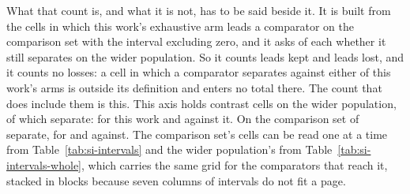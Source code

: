 \documentclass[journal=jcisd8,manuscript=suppinfo,layout=onecolumn]{achemso}
\begin{document}
What that count is, and what it is not, has to be said beside it. It is built from the cells in
which this work's exhaustive arm leads a comparator on the comparison set with the interval
excluding zero, and it asks of each whether it still separates on the wider population. So it
counts leads kept and leads lost, and it counts no losses: a cell in which a comparator separates
against either of this work's arms is outside its definition and enters no total there. The count
that does include them is this. This axis holds \numPopdefCellswhole{} contrast cells on the wider
population, of which \numPopdefSeparatingwhole{} separate: \numPopdefForthisworkwholeWord{} for
this work and \numPopdefAgainstthisworkwholeWord{} against it. On the comparison set
\numPopdefSeparatingcomp{} of \numPopdefCellscomp{} separate, \numPopdefForthisworkcompWord{} for
and \numPopdefAgainstthisworkcompWord{} against. The comparison set's cells can be read one at a
time from Table~\ref{tab:si-intervals} and the wider population's from
Table~\ref{tab:si-intervals-whole}, which carries the same grid for the \numPopdefWholearmsWord{}
comparators that reach it, stacked in blocks because seven columns of intervals do not fit a page.

\end{document}

